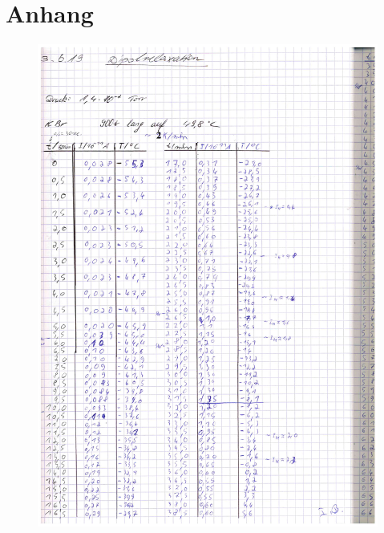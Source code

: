 \section{Anhang}
\label{sec:Anhang}
\begin{figure}[htb]
  \centering
  \includegraphics[height=\textheight]{data/Messdaten1.pdf}
\end{figure}
